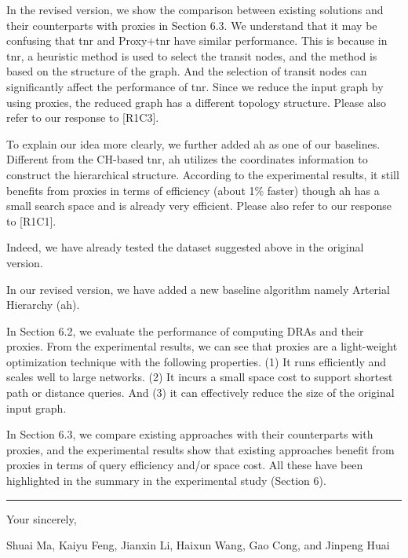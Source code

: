 \documentclass[11pt]{letter}
\newcommand{\vs}{\vspace{1ex}}
\newcommand{\svs}{\vspace{0.36ex}}
\newcommand{\ah}{{\sc ah}\xspace}
\newcommand{\tnr}{{\sc tnr}\xspace}
\begin{document}
In the revised version, we show the comparison between existing solutions and their counterparts with proxies in Section 6.3. We understand that it may be confusing that \tnr and Proxy+\tnr have similar performance. This is because in \tnr, a heuristic method is used to select the transit nodes, and the method is based on the structure of the graph. And the selection of transit nodes can significantly affect the performance of \tnr. Since we reduce the input graph by using proxies, the reduced graph has a different topology structure. Please also refer to our response to [R1C3].

To explain our idea more clearly, we further added \ah as one of our baselines. Different from the CH-based \tnr, \ah utilizes the coordinates information to construct the hierarchical structure. According to the experimental results,  it still benefits from proxies in terms of efficiency (about 1\% faster) though \ah has a small search space and is already very efficient. Please also refer to our response to [R1C1].



\vs{}
\svs

Indeed, we have already tested the dataset suggested above in the original version.

In our revised version, we have added a new baseline algorithm namely Arterial Hierarchy (\ah).

In Section 6.2, we evaluate the performance of computing DRAs and their proxies. From the experimental results, we can see that proxies are a light-weight optimization technique with the following properties. (1) It runs efficiently and scales well to large networks. (2) It incurs a small space cost to support shortest path or distance queries. And (3) it can effectively reduce the size of the original input graph.

In Section 6.3, we compare existing approaches with their counterparts with proxies, and the experimental results show that existing approaches benefit from proxies in terms of query efficiency and/or space cost.  All these have been highlighted in the summary in the experimental study (Section 6).



\vspace{3.6ex}
\hrule
\vspace{3.6ex}
\closing{Your sincerely,}

\vspace{-8ex}
Shuai Ma, Kaiyu Feng, Jianxin Li, Haixun Wang, Gao Cong, and Jinpeng Huai
\end{document}
